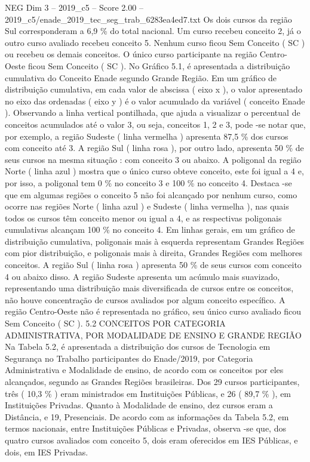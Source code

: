 \begin{textsample}{NEG Dim 3 – 2019\_c5 – Score 2.00 – 2019\_c5/enade\_2019\_tec\_seg\_trab\_6283ea4ed7.txt}
Os dois cursos da região Sul corresponderam a 6,9 \% do total nacional.
Um curso recebeu conceito 2, já o outro curso avaliado recebeu conceito 5.
Nenhum curso ficou Sem Conceito ( SC ) ou recebeu os demais conceitos.
O único curso participante na região Centro-Oeste ficou Sem Conceito ( SC ).
No Gráfico 5.1, é apresentada a distribuição cumulativa do Conceito Enade segundo Grande Região.
Em um gráfico de distribuição cumulativa, em cada valor de abscissa ( eixo x ), o valor apresentado no eixo das ordenadas ( eixo y ) é o valor acumulado da variável ( conceito Enade ).
Observando a linha vertical pontilhada, que ajuda a visualizar o percentual de conceitos acumulados até o valor 3, ou seja, conceitos 1, 2 e 3, pode -se notar que, por exemplo, a região Sudeste ( linha vermelha ) apresenta 87,5 \% dos cursos com conceito até 3.
A região Sul ( linha rosa ), por outro lado, apresenta 50 \% de seus cursos na mesma situação : com conceito 3 ou abaixo.
A poligonal da região Norte ( linha azul ) mostra que o único curso obteve conceito, este foi igual a 4 e, por isso, a poligonal tem 0 \% no conceito 3 e 100 \% no conceito 4.
Destaca -se que em algumas regiões o conceito 5 não foi alcançado por nenhum curso, como ocorre nas regiões Norte ( linha azul ) e Sudeste ( linha vermelha ), nas quais todos os cursos têm conceito menor ou igual a 4, e as respectivas poligonais cumulativas alcançam 100 \% no conceito 4.
Em linhas gerais, em um gráfico de distribuição cumulativa, poligonais mais à esquerda representam Grandes Regiões com pior distribuição, e poligonais mais à direita, Grandes Regiões com melhores conceitos.
A região Sul ( linha rosa ) apresenta 50 \% de seus cursos com conceito 4 ou abaixo disso.
A região Sudeste apresenta um acúmulo mais suavizado, representando uma distribuição mais diversificada de cursos entre os conceitos, não houve concentração de cursos avaliados por algum conceito específico.
A região Centro-Oeste não é representada no gráfico, seu único curso avaliado ficou Sem Conceito ( SC ). 5.2 CONCEITOS POR CATEGORIA ADMINISTRATIVA, POR MODALIDADE DE ENSINO E GRANDE REGIÃO Na Tabela 5.2, é apresentada a distribuição dos cursos de Tecnologia em Segurança no Trabalho participantes do Enade/2019, por Categoria Administrativa e Modalidade de ensino, de acordo com os conceitos por eles alcançados, segundo as Grandes Regiões brasileiras.
Dos 29 cursos participantes, três ( 10,3 \% ) eram ministrados em Instituições Públicas, e 26 ( 89,7 \% ), em Instituições Privadas.
Quanto à Modalidade de ensino, dez cursos eram a Distância, e 19, Presenciais.
De acordo com as informações da Tabela 5.2, em termos nacionais, entre Instituições Públicas e Privadas, observa -se que, dos quatro cursos avaliados com conceito 5, dois eram oferecidos em IES Públicas, e dois, em IES Privadas.

\end{textsample}
